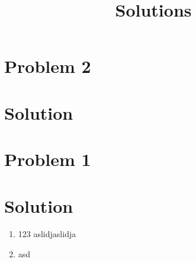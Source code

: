 \documentclass{article}
\begin{document}


\section*{Problem 2}

\section*{Solution}

\section*{Problem 1}

\section*{Solution}
\title{Solutions}
\begin{enumerate}
        \item 123
aslidjaslidja
        \item asd

\end{enumerate}
\end{document}
